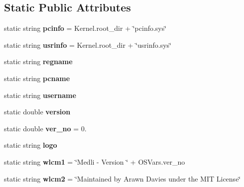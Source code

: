 \subsection*{Static Public Attributes}
\begin{DoxyCompactItemize}
\item 
\mbox{\label{class_medli_1_1_o_s_vars_a31f1fb102014c90959be5435b784997a}} 
static string {\bfseries pcinfo} = Kernel.\+root\+\_\+dir + \char`\"{}pcinfo.\+sys\char`\"{}
\item 
\mbox{\label{class_medli_1_1_o_s_vars_a3c3cfcb05e907de61fb001a75e907921}} 
static string {\bfseries usrinfo} = Kernel.\+root\+\_\+dir + \char`\"{}usrinfo.\+sys\char`\"{}
\item 
\mbox{\label{class_medli_1_1_o_s_vars_ab5add4aeabebc0cd177bdefd2192734f}} 
static string {\bfseries regname}
\item 
\mbox{\label{class_medli_1_1_o_s_vars_a100784c5c65a50b9ce8f597648d78a92}} 
static string {\bfseries pcname}
\item 
\mbox{\label{class_medli_1_1_o_s_vars_ab1f0325089352834b31db8c8dd93edca}} 
static string {\bfseries username}
\item 
\mbox{\label{class_medli_1_1_o_s_vars_a5c3c4b258dd5676a348a638842bc0870}} 
static double {\bfseries version}
\item 
\mbox{\label{class_medli_1_1_o_s_vars_ab2e330590f80ba5bcad4723edd9c944b}} 
static double {\bfseries ver\+\_\+no} = 0.
\item 
static string {\bfseries logo}
\item 
\mbox{\label{class_medli_1_1_o_s_vars_a3efcabe4d0f5df4185c771c3dcaa7cc3}} 
static string {\bfseries wlcm1} = \char`\"{}Medli -\/ Version \char`\"{} + O\+S\+Vars.\+ver\+\_\+no
\item 
\mbox{\label{class_medli_1_1_o_s_vars_a62f7ad6a1f67fa38f9ba340f6445ae70}} 
static string {\bfseries wlcm2} = \char`\"{}Maintained by Arawn Davies under the M\+IT License\char`\"{}
\end{DoxyCompactItemize}


